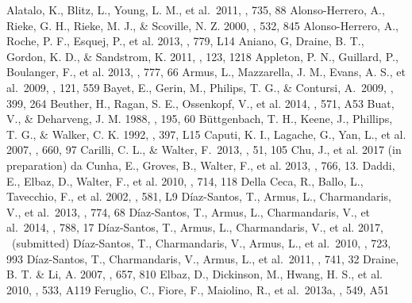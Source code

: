 \documentclass[preprint]{aastex}
\begin{document}
\vspace{0.25in}
\begin{references}
 Alatalo, K., Blitz, L., Young, L. M., et al.~2011, \apj, 735, 88
 Alonso-Herrero, A., Rieke, G. H., Rieke, M. J., \& Scoville, N. Z. 2000, \apj, 532, 845
 Alonso-Herrero, A., Roche, P. F., Esquej, P., et al. 2013, \apj, 779, L14
 Aniano, G, Draine, B. T., Gordon, K. D., \& Sandstrom, K. 2011, \pasp, 123, 1218
 Appleton, P. N., Guillard, P., Boulanger, F., et al. 2013, \apj, 777, 66
 Armus, L., Mazzarella, J. M., Evans, A. S., et al.~2009, \pasp, 121, 559
 Bayet, E., Gerin, M., Philips, T. G., \& Contursi, A.~2009, \mnras, 399, 264
 Beuther, H., Ragan, S. E., Ossenkopf, V., et al. 2014, \aap, 571, A53
 Buat, V., \& Deharveng, J. M. 1988, \aap, 195, 60
 B\"uttgenbach, T. H., Keene, J., Phillips, T. G., \& Walker, C. K. 1992, \apj, 397, L15
 Caputi, K. I., Lagache, G., Yan, L., et al. 2007, \apj, 660, 97
 Carilli, C. L., \& Walter, F.~2013, \araa, 51, 105
 Chu, J., et al. 2017 (in preparation)
 da Cunha, E., Groves, B., Walter, F., et al. 2013, \apj, 766, 13.
 Daddi, E., Elbaz, D., Walter, F., et al. 2010, \apj, 714, 118
 Della Ceca, R., Ballo, L., Tavecchio, F., et al. 2002, \apj, 581, L9
 D\'iaz-Santos, T., Armus, L., Charmandaris, V., et al.~2013, \apj, 774, 68
 D\'iaz-Santos, T., Armus, L., Charmandaris, V., et al.~2014, \apj, 788, 17
 D\'iaz-Santos, T., Armus, L., Charmandaris, V., et al. 2017, \apj\ (submitted)
 D\'iaz-Santos, T., Charmandaris, V., Armus, L., et al.~2010, \apj, 723, 993
 D\'iaz-Santos, T., Charmandaris, V., Armus, L., et al.~2011, \apj, 741, 32
 Draine, B. T. \& Li, A. 2007, \apj, 657, 810
 Elbaz, D., Dickinson, M., Hwang, H. S., et al. 2010, \aap, 533, A119
 Feruglio, C., Fiore, F., Maiolino, R., et al.~2013a, \aap, 549, A51

\end{references}
\end{document}
